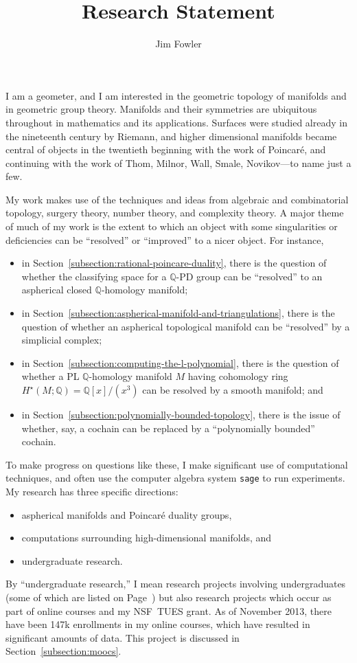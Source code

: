 \documentclass[12pt]{amsart}
\title{Research Statement}
\author{Jim Fowler}
\theoremstyle{definition}
\newcommand{\Q}{\mathbb{Q}}
\begin{document}
\maketitle

I am a geometer, and I am interested in the geometric topology of
manifolds and in geometric group theory.  Manifolds and their
symmetries are ubiquitous throughout in mathematics and its
applications.  Surfaces were studied already in the nineteenth century
by Riemann, and higher dimensional manifolds became central of objects
in the twentieth beginning with the work of Poincar\'e, and continuing
with the work of Thom, Milnor, Wall, Smale, Novikov---to name just a
few.

My work makes use of the techniques and ideas from algebraic and
combinatorial topology, surgery theory, number theory, and complexity
theory.  A major theme of much of my work is the extent to which an
object with some singularities or deficiencies can be ``resolved'' or
``improved'' to a nicer object.  For instance,
\begin{itemize}
\item in Section~\ref{subsection:rational-poincare-duality},
  there is the question of whether the classifying space for a
  $\Q$-PD group can be ``resolved'' to an aspherical closed
  $\mathbb{Q}$-homology manifold;
\item in
  Section~\ref{subsection:aspherical-manifold-and-triangulations},
  there is the question of whether an aspherical topological manifold
  can be ``resolved'' by a simplicial complex;
\item in Section~\ref{subsection:computing-the-l-polynomial}, there
  is the question of whether a PL $\mathbb{Q}$-homology manifold $M$
  having cohomology ring $H^\star(M;\Q) = \Q[x]/(x^3)$ can be resolved
  by a smooth manifold; and
\item in Section~\ref{subsection:polynomially-bounded-topology}, there 
  is the issue of whether, say, a cochain can be replaced by a
  ``polynomially bounded'' cochain.
\end{itemize}
To make progress on questions like these, I make significant use of
computational techniques, and often use the computer algebra system
\texttt{sage} to run experiments.  My research has three specific
directions:
\begin{itemize}
\item aspherical manifolds and Poincar\'e duality groups,
\item computations surrounding high-dimensional manifolds, and
\item undergraduate research.
\end{itemize}
By ``undergraduate research,'' I mean research projects involving
undergraduates (some of which are listed on
Page~\pageref{section:undergraduate-research}) but also research
projects which occur as part of online courses and my NSF~TUES grant.
As of November 2013, there have been 147k enrollments in my online
courses, which have resulted in significant amounts of data.  This
project is discussed in Section~\ref{subsection:moocs}.
\end{document}
